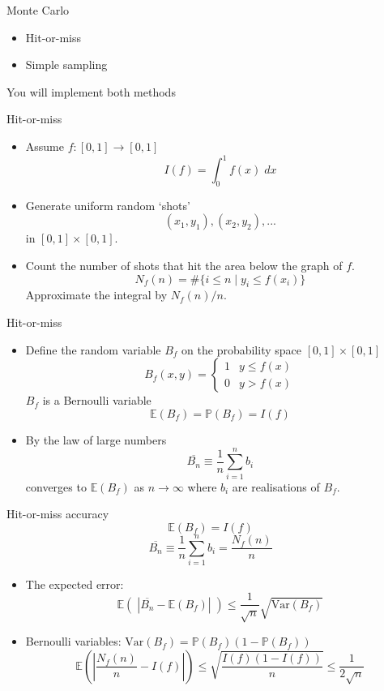 \documentclass[10pt]{beamer}
\begin{document}
\begin{frame}[label={sec:org325ebac}]{Monte Carlo}
\begin{itemize}
\item Hit-or-miss
\item Simple sampling
\end{itemize}

You will implement both methods
\end{frame}
\begin{frame}[label={sec:orgdafce8c}]{Hit-or-miss}
\begin{itemize}
\item Assume \(f:[0,1]\to[0,1]\)
$$I(f) = \int_{0}^{1} f(x)\;dx$$
\item Generate uniform random `shots'
$$(x_1,y_1), (x_2,y_2), ...$$
in \([0,1]\times[0,1]\).
\item Count the number of shots that \alert{hit} the area below the graph of \(f\).
$$N_f (n) = \#\{ i \leq n \mid y_i \leq f(x_i) \}$$
Approximate the integral by \(N_f(n) / n\).
\end{itemize}
\end{frame}
\begin{frame}[label={sec:orgaf488ab}]{Hit-or-miss}
\begin{itemize}
\item Define the random variable \(B_f\) on the probability space \([0,1]\times[0,1]\)
$$B_f(x,y)=\begin{cases}1 & y \leq f(x)\\0 & y > f(x)\end{cases}$$
\(B_f\) is a Bernoulli variable
$$\mathbb{E}(B_f) = \mathbb{P}(B_f) = I(f)$$
\item By the law of large numbers
$$\overline{B_n} \equiv \frac{1}{n} \sum_{i=1}^n b_i$$
converges to \(\mathbb{E}(B_f)\) as \(n\to\infty\) where \(b_i\) are realisations of \(B_f\).
\end{itemize}
\end{frame}
\begin{frame}[label={sec:org86ca8ab}]{Hit-or-miss accuracy}
$$\mathbb{E}(B_f) = I(f)$$
$$\overline{B_n} \equiv \frac{1}{n} \sum_{i=1}^n b_i = \frac{N_f(n)}{n}$$
\begin{itemize}
\item The expected error:
$$\mathbb{E}(\;|\overline{B_n} - \mathbb{E}(B_f)|\;) \leq \frac{1}{\sqrt{n}} \sqrt{\mathrm{Var}(B_f)}$$
\item Bernoulli variables: \(\mathrm{Var}(B_f) = \mathbb{P}(B_f) (1-\mathbb{P}(B_f))\)
$$\mathbb{E}\left( \left\vert \frac{N_f(n)}{n} - I(f) \right\vert \right) \leq \sqrt{\frac{I(f)(1-I(f))}{n}} \leq \frac{1}{2\sqrt{n}}$$
\end{itemize}
\end{frame}
\end{document}
